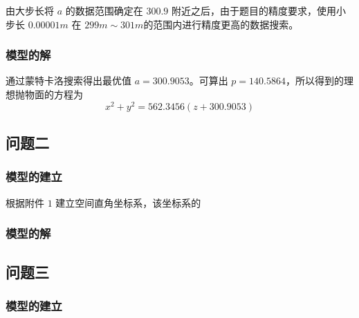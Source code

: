 \documentclass[withoutpreface,bwprint]{cumcmthesis} %
\begin{document}
由大步长将 $a$ 的数据范围确定在 $300.9$ 附近之后，由于题目的精度要求，使用小步长 $0.00001m$ 在
$299m \sim 301m$的范围内进行精度更高的数据搜索。
\subsubsection{模型的解}
通过蒙特卡洛搜索得出最优值 $a = 300.9053$。可算出 $p = 140.5864$，所以得到的理想抛物面的方程为
\[
    x^2 + y^2 = 562.3456(z + 300.9053)
\]
\subsection{问题二}
\subsubsection{模型的建立}
根据附件 $1$ 建立空间直角坐标系，该坐标系的
\subsubsection{模型的解}
\subsection{问题三}
\subsubsection{模型的建立}
\end{document}

